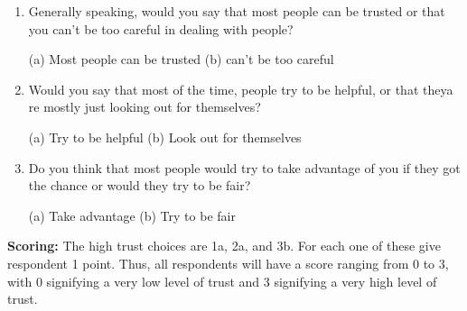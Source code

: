 \begin{enumerate}
\item Generally speaking, would you say that most people can be trusted or that you can’t be too careful in dealing with people?

(a) Most people can be trusted 
(b) can’t be too careful

\item Would you say that most of the time, people try to be helpful, or that theya re mostly just looking out for themselves?

(a) Try to be helpful 
(b) Look out for themselves

\item Do you think that most people would try to take advantage of you if they got the chance or would they try to be fair?

(a) Take advantage
(b) Try to be fair
\end{enumerate}

\textbf{Scoring:}
The high trust choices are 1a, 2a, and 3b. For each one of these give respondent 1 point.
Thus, all respondents will have a score ranging from 0 to 3, with 0 signifying a very low
level of trust and 3 signifying a very high level of trust.